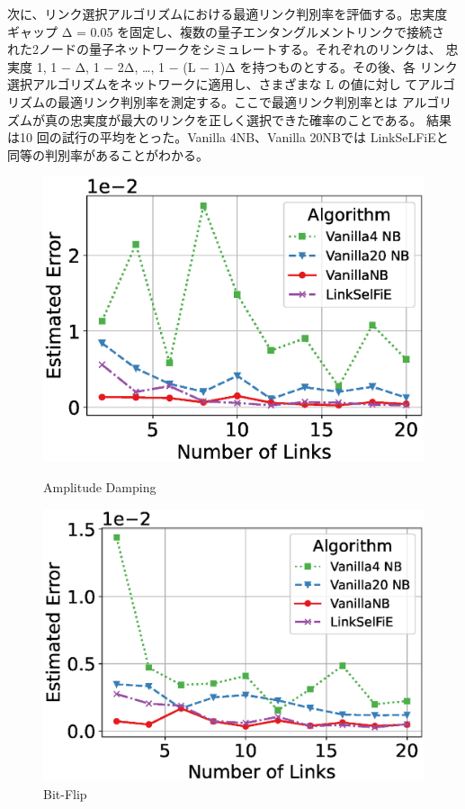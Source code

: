 \documentclass[technicalreport,dvipdfmx]{ieicej}
\begin{document}
次に、リンク選択アルゴリズムにおける最適リンク判別率を評価する。忠実度
ギャップ Δ = 0.05 を固定し、複数の量子エンタングルメントリンクで接続さ
れた2ノードの量子ネットワークをシミュレートする。それぞれのリンクは、
忠実度 1, 1 − Δ, 1 − 2Δ, …, 1 − (L − 1)Δ を持つものとする。その後、各
リンク選択アルゴリズムをネットワークに適用し、さまざまな L の値に対し
てアルゴリズムの最適リンク判別率を測定する。ここで最適リンク判別率とは
アルゴリズムが真の忠実度が最大のリンクを正しく選択できた確率のことである。
結果は10 回の試行の平均をとった。Vanilla 4NB、Vanilla 20NBでは
LinkSeLFiEと同等の判別率があることがわかる。
\begin{figure}[h]
\centering
\begin{minipage}[b]{0.45\columnwidth}
\centering
\includegraphics[width=\textwidth]{figure/plot_error_vs_path_num_AmplitudeDamping.eps}
\caption{\small Amplitude Damping}\end{minipage}
\hfill
\begin{minipage}[b]{0.45\columnwidth}
\centering
\includegraphics[width=\textwidth]{figure/plot_error_vs_path_num_BitFlip.eps}
\caption{\small Bit-Flip}\end{minipage}
\end{figure}
\end{document}

